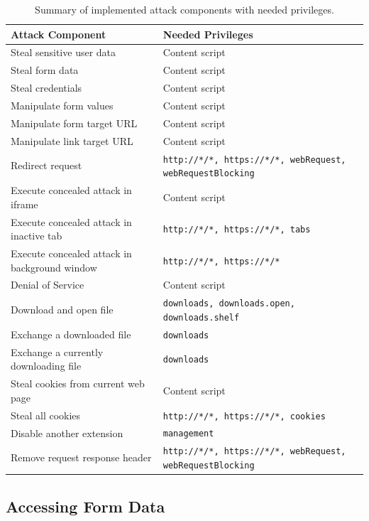 	\begin{table}[h]
		\begin{tabular}{|l|l|} \hline 
			\textbf{Attack Component} & \textbf{Needed Privileges} \\ \hline
			Steal sensitive user data & Content script \\ \hline
			Steal form data & Content script \\ \hline
			Steal credentials & Content script \\ \hline
			Manipulate form values & Content script \\ \hline
			Manipulate form target URL & Content script \\ \hline
			Manipulate link target URL & Content script \\ \hline
			Redirect request & \texttt{http://*/*, https://*/*, webRequest, webRequestBlocking} \\ \hline
			Execute concealed attack in iframe & Content script \\ \hline
			Execute concealed attack in inactive tab & \texttt{http://*/*, https://*/*, tabs} \\ \hline
			Execute concealed attack in background window & \texttt{http://*/*, https://*/*} \\ \hline
			Denial of Service & Content script \\ \hline
			Download and open file & \texttt{downloads, downloads.open, downloads.shelf} \\ \hline
			Exchange a downloaded file & \texttt{downloads} \\ \hline
			Exchange a currently downloading file & \texttt{downloads} \\ \hline
			Steal cookies from current web page & Content script \\ \hline
			Steal all cookies & \texttt{http://*/*, https://*/*, cookies} \\ \hline
			Disable another extension & \texttt{management} \\ \hline
			Remove request response header & \texttt{http://*/*, https://*/*, webRequest, webRequestBlocking} \\ \hline
		\end{tabular}
		\caption{Summary of implemented attack components with needed privileges.}
		\label{tab:summaryAttacks}
	\end{table}

\subsection{Accessing Form Data}
\label{sec:stealFormData}

